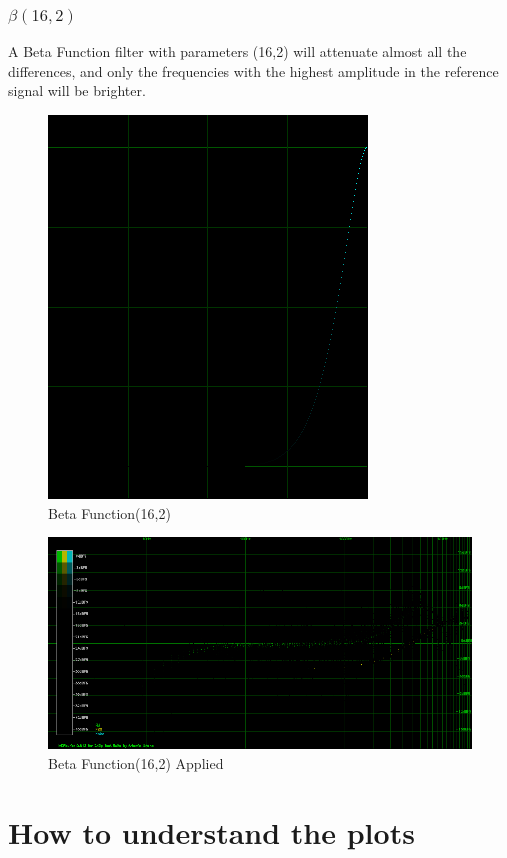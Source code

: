 \documentclass[10pt,a4paper]{report}
\begin{document}
\newpage
\subsection{$\beta(16,2)$} 

A Beta Function filter with parameters (16,2) will attenuate almost all the differences, and only the frequencies with the highest amplitude in the reference signal will be brighter.

\begin{figure}[H]
	\centering
	\includegraphics[width=0.4\linewidth]{plots/BetaFunctionPlot_5}
	\caption[Beta Function(16,2)]{Beta Function(16,2)}
	\label{fig:betafunctionplot5}
\end{figure}

\begin{figure}[H]
	\centering
	\includegraphics[width=1\linewidth]{plots/BetaFunctionPlot_5_Data}
	\caption[Beta Function(16,2)]{Beta Function(16,2) Applied}
	\label{fig:betafunctionplot5data}
\end{figure}

\chapter{How to understand the plots}
\label{howtoplots}
\end{document}
